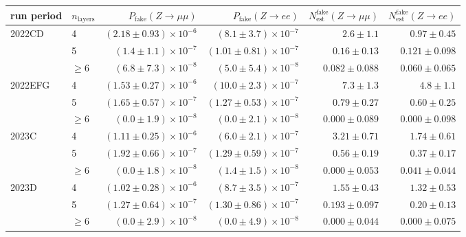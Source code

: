 \begin{tabular}{llrrrr}
\toprule
run period & $n_{\mathrm{layers}}$ & $P_{\mathrm{fake}}(Z\to\mu\mu)$ & $P_{\mathrm{fake}}(Z\to ee)$ & $N^{\mathrm{fake}}_{\mathrm{est}}(Z\to\mu\mu)$ & $N^{\mathrm{fake}}_{\mathrm{est}}(Z\to ee)$ \\
\midrule
2022CD & 4 & $(2.18 \pm 0.93) \times 10^{-6}$ & $(8.1 \pm 3.7) \times 10^{-7}$ & $2.6 \pm 1.1$ & $0.97 \pm 0.45$ \\
 & 5 & $(1.4 \pm 1.1) \times 10^{-7}$ & $(1.01 \pm 0.81) \times 10^{-7}$ & $0.16 \pm 0.13$ & $0.121 \pm 0.098$ \\
 & $\geq 6$ & $(6.8 \pm 7.3) \times 10^{-8}$ & $(5.0 \pm 5.4) \times 10^{-8}$ & $0.082 \pm 0.088$ & $0.060 \pm 0.065$ \\
\midrule
2022EFG & 4 & $(1.53 \pm 0.27) \times 10^{-6}$ & $(10.0 \pm 2.3) \times 10^{-7}$ & $7.3 \pm 1.3$ & $4.8 \pm 1.1$ \\
 & 5 & $(1.65 \pm 0.57) \times 10^{-7}$ & $(1.27 \pm 0.53) \times 10^{-7}$ & $0.79 \pm 0.27$ & $0.60 \pm 0.25$ \\
 & $\geq 6$ & $(0.0 \pm 1.9) \times 10^{-8}$ & $(0.0 \pm 2.1) \times 10^{-8}$ & $0.000 \pm 0.089$ & $0.000 \pm 0.098$ \\
\midrule
2023C & 4 & $(1.11 \pm 0.25) \times 10^{-6}$ & $(6.0 \pm 2.1) \times 10^{-7}$ & $3.21 \pm 0.71$ & $1.74 \pm 0.61$ \\
 & 5 & $(1.92 \pm 0.66) \times 10^{-7}$ & $(1.29 \pm 0.59) \times 10^{-7}$ & $0.56 \pm 0.19$ & $0.37 \pm 0.17$ \\
 & $\geq 6$ & $(0.0 \pm 1.8) \times 10^{-8}$ & $(1.4 \pm 1.5) \times 10^{-8}$ & $0.000 \pm 0.053$ & $0.041 \pm 0.044$ \\
\midrule
2023D & 4 & $(1.02 \pm 0.28) \times 10^{-6}$ & $(8.7 \pm 3.5) \times 10^{-7}$ & $1.55 \pm 0.43$ & $1.32 \pm 0.53$ \\
 & 5 & $(1.27 \pm 0.64) \times 10^{-7}$ & $(1.30 \pm 0.86) \times 10^{-7}$ & $0.193 \pm 0.097$ & $0.20 \pm 0.13$ \\
 & $\geq 6$ & $(0.0 \pm 2.9) \times 10^{-8}$ & $(0.0 \pm 4.9) \times 10^{-8}$ & $0.000 \pm 0.044$ & $0.000 \pm 0.075$ \\
\bottomrule
\end{tabular}
